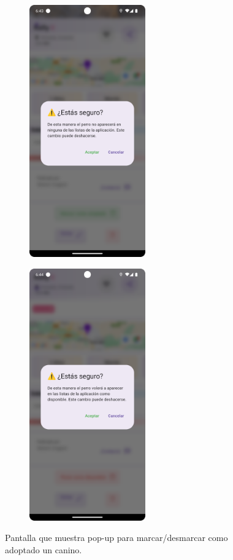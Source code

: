\documentclass[a4paper, 12pt]{article}
\begin{document}
\begin{figure}[H]
   	\begin{subfigure}{0.48\textwidth}
		\begin{center}
			{\includegraphics[width=5cm]{app/AdoptedDialog.png}\par}
		\end{center}  
	\end{subfigure}\hfill
   	\begin{subfigure}{0.48\textwidth}
		\begin{center}
			{\includegraphics[width=5cm]{app/UnAdoptDog.png}\par}
		\end{center}  
	\end{subfigure}\hfill
	\caption{Pantalla que muestra pop-up para marcar/desmarcar como adoptado un canino.}
\end{figure}
\end{document}

